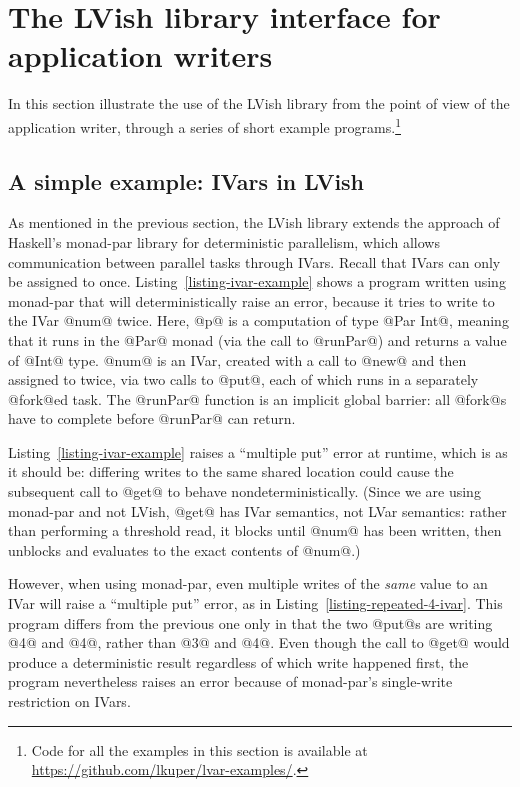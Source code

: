 \section{The LVish library interface for application writers}\label{s:lvish-api}

In this section  illustrate the use of the LVish library
from the point of view of the application writer, through a series of
short example programs.\footnote{Code for all the examples in this
  section is available at
  \url{https://github.com/lkuper/lvar-examples/}.}

\subsection{A simple example: IVars in LVish}

\ifdefined\DISSERTATION

As mentioned in the previous section, the LVish library extends the
approach of Haskell's monad-par library for deterministic parallelism,
which allows communication between parallel tasks through IVars.
Recall that IVars can only be assigned to once.
Listing~\ref{listing-ivar-example} shows a program written using
monad-par that will deterministically raise an error, because it tries
to write to the IVar @num@ twice.  Here, @p@ is a computation of type
@Par Int@, meaning that it runs in the @Par@ monad (via the call to
@runPar@) and returns a value of @Int@ type.  @num@ is an IVar,
created with a call to @new@ and then assigned to twice, via two calls
to @put@, each of which runs in a separately @fork@ed task.  The
@runPar@ function is an implicit global barrier: all @fork@s have to
complete before @runPar@ can return.

\singlespacing

\doublespacing

Listing~\ref{listing-ivar-example} raises a ``multiple put'' error at
runtime, which is as it should be: differing writes to the same shared
location could cause the subsequent call to @get@ to behave
nondeterministically.  (Since we are using monad-par and not LVish,
@get@ has IVar semantics, not LVar semantics: rather than performing a
threshold read, it blocks until @num@ has been written, then unblocks
and evaluates to the exact contents of @num@.)

However, when using monad-par, even multiple writes of the \emph{same}
value to an IVar will raise a ``multiple put'' error, as in
Listing~\ref{listing-repeated-4-ivar}.  This program differs from the
previous one only in that the two @put@s are writing @4@ and @4@,
rather than @3@ and @4@.  Even though the call to @get@ would produce
a deterministic result regardless of which write happened first, the
program nevertheless raises an error because of monad-par's
single-write restriction on IVars.

